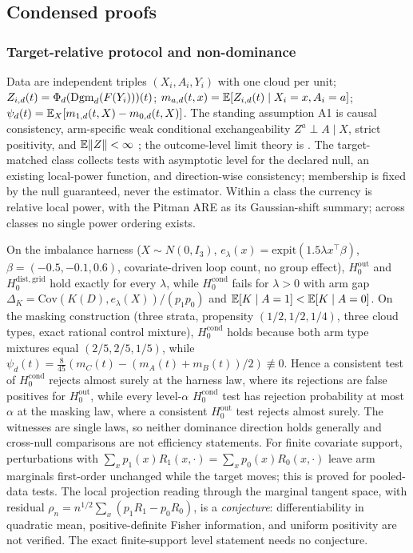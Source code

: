 \subsection{Condensed proofs}
\label{app:proofs}

\subsubsection{Target-relative protocol and non-dominance}
\label{app:target}

Data are independent triples $(X_i,A_i,Y_i)$ with one cloud per unit; $Z_{i,d}(t)=\Phi_d(\mathrm{Dgm}_d(F(Y_i)))(t)$; $m_{a,d}(t,x)=\mathbb{E}[Z_{i,d}(t)\mid X_i=x,A_i=a]$; $\psi_d(t)=\mathbb{E}_X[m_{1,d}(t,X)-m_{0,d}(t,X)]$. The standing assumption A1 is causal consistency, arm-specific weak conditional exchangeability $Z^a\perp A\mid X$, strict positivity, and $\mathbb{E}\lVert Z\rVert<\infty$ \cite{souto_diamantis_tcda_2026}; the outcome-level limit theory is \cite{kim_lee_tce_2026}. The target-matched class collects tests with asymptotic level for the declared null, an existing local-power function, and direction-wise consistency; membership is fixed by the null guaranteed, never the estimator. Within a class the currency is relative local power, with the Pitman ARE as its Gaussian-shift summary; across classes no single power ordering exists.

On the imbalance harness ($X\sim N(0,I_3)$, $e_\lambda(x)=\mathrm{expit}(1.5\lambda x^\top\beta)$, $\beta=(-0.5,-0.1,0.6)$, covariate-driven loop count, no group effect), $H_0^{\mathrm{out}}$ and $H_0^{\mathrm{dist,grid}}$ hold exactly for every $\lambda$, while $H_0^{\mathrm{cond}}$ fails for $\lambda>0$ with arm gap $\Delta_K=\mathrm{Cov}(K(D),e_\lambda(X))/(p_1p_0)$ and $\mathbb{E}[K\mid A=1]<\mathbb{E}[K\mid A=0]$. On the masking construction (three strata, propensity $(1/2,1/2,1/4)$, three cloud types, exact rational control mixture), $H_0^{\mathrm{cond}}$ holds because both arm type mixtures equal $(2/5,2/5,1/5)$, while $\psi_d(t)=\frac{8}{45}(m_C(t)-(m_A(t)+m_B(t))/2)\not\equiv0$. Hence a consistent test of $H_0^{\mathrm{cond}}$ rejects almost surely at the harness law, where its rejections are false positives for $H_0^{\mathrm{out}}$, while every level-$\alpha$ $H_0^{\mathrm{cond}}$ test has rejection probability at most $\alpha$ at the masking law, where a consistent $H_0^{\mathrm{out}}$ test rejects almost surely. The witnesses are single laws, so neither dominance direction holds generally and cross-null comparisons are not efficiency statements. For finite covariate support, perturbations with $\sum_x p_1(x)R_1(x,\cdot)=\sum_x p_0(x)R_0(x,\cdot)$ leave arm marginals first-order unchanged while the target moves; this is proved for pooled-data tests. The local projection reading through the marginal tangent space, with residual $\rho_n=n^{1/2}\sum_x(p_1R_1-p_0R_0)$, is a \emph{conjecture}: differentiability in quadratic mean, positive-definite Fisher information, and uniform positivity are not verified. The exact finite-support level statement needs no conjecture.

